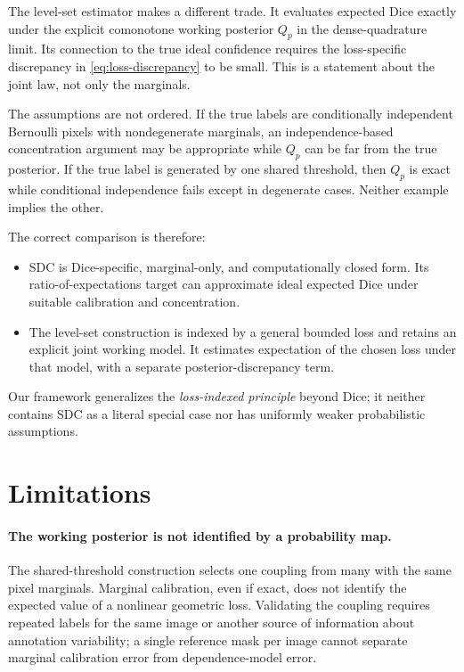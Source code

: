 The level-set estimator makes a different trade. It evaluates expected Dice exactly
under the explicit comonotone working posterior $Q_p$ in the dense-quadrature limit.
Its connection to the true ideal confidence requires the loss-specific discrepancy
in \eqref{eq:loss-discrepancy} to be small. This is a statement about the joint law,
not only the marginals.

The assumptions are not ordered. If the true labels are conditionally independent
Bernoulli pixels with nondegenerate marginals, an independence-based concentration
argument may be appropriate while $Q_p$ can be far from the true posterior. If the
true label is generated by one shared threshold, then $Q_p$ is exact while conditional
independence fails except in degenerate cases. Neither example implies the other.

The correct comparison is therefore:
\begin{itemize}
\item SDC is Dice-specific, marginal-only, and computationally closed form. Its
ratio-of-expectations target can approximate ideal expected Dice under suitable
calibration and concentration.
\item The level-set construction is indexed by a general bounded loss and retains an
explicit joint working model. It estimates expectation of the chosen loss under that
model, with a separate posterior-discrepancy term.
\end{itemize}
Our framework generalizes the \emph{loss-indexed principle} beyond Dice; it neither
contains SDC as a literal special case nor has uniformly weaker probabilistic
assumptions.

\section{Limitations}\label{sec:limitations}

\paragraph{The working posterior is not identified by a probability map.}
The shared-threshold construction selects one coupling from many with the same pixel
marginals. Marginal calibration, even if exact, does not identify the expected value
of a nonlinear geometric loss. Validating the coupling requires repeated labels for
the same image or another source of information about annotation variability; a
single reference mask per image cannot separate marginal calibration error from
dependence-model error.


